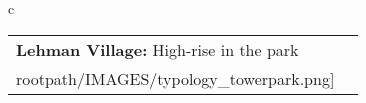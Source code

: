 \begin{table}[H]
        \begin{tabular}{c}
        \begin{tabular}{m{1.5in} m{2in}}
\textbf{Lehman Village:} {High-rise in the park} & \texttt{[image: \\rootpath/IMAGES/typology\_towerpark.png]}
\end{tabular}\end{tabular}
        \end{table}